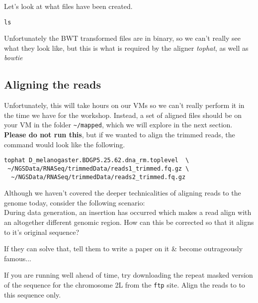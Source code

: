 \begin{steps}
Let's look at what files have been created.
\begin{lstlisting}
ls
\end{lstlisting}
Unfortunately the BWT transformed files are in binary, so we can't really see what they look like, but this is what is required by the aligner \textit{tophat}, as well as \textit{bowtie} 
\end{steps}

\subsection{Aligning the reads}
Unfortunately, this will take hours on our VMs so we can't really perform it in the time we have for the workshop.
Instead, a set of aligned files should be on your VM in the folder \texttt{\~{}/mapped}, which we will explore in the next section.
\textbf{Please do not run this}, but if we wanted to align the trimmed reads, the command would look like the following.
\begin{lstlisting}[style=command_syntax]
tophat D_melanogaster.BDGP5.25.62.dna_rm.toplevel  \ 
 ~/NGSData/RNASeq/trimmedData/reads1_trimmed.fq.gz \
  ~/NGSData/RNASeq/trimmedData/reads2_trimmed.fq.gz
\end{lstlisting}

\begin{advanced}
\begin{questions}
Although we haven't covered the deeper technicalities of aligning reads to the genome today, consider the following scenario:\\

During data generation, an insertion has occurred which makes a read align with an altogether different genomic region.
How can this be corrected so that it aligns to it's original sequence? \\
\begin{answer}
If they can solve that, tell them to write a paper on it \& become outrageously famous...
\end{answer}
\end{questions}
\end{advanced}

\begin{bonus}
If you are running well ahead of time, try downloading the repeat masked version of the sequence for the chromosome 2L from the \texttt{ftp} site.
Align the reads to to this sequence only.
\end{bonus}